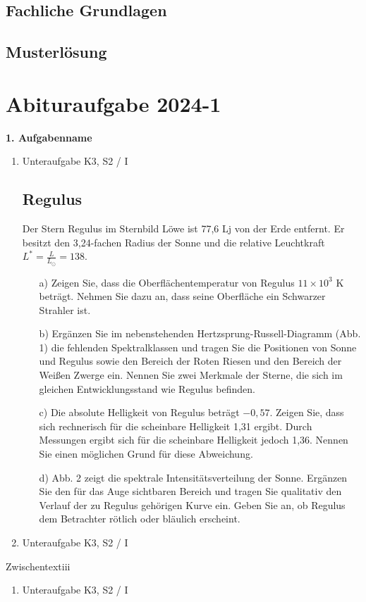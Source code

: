 \section{Fachliche Grundlagen}

\section{Musterlösung}


\chapter{Abituraufgabe 2024-1}\label{Denk} 
\begin{aufgabe} 
\textbf{1. Aufgabenname} 
\begin{enumerate} 
    \item Unteraufgabe \hfill K3, S2 / I 
    \section*{Regulus} 
    Der Stern Regulus im Sternbild Löwe ist 77,6 Lj von der Erde entfernt. Er besitzt den 3,24-fachen Radius der Sonne und die relative Leuchtkraft $L^* = \frac{L}{L_\odot} = 138$. 
    \begin{enumerate} 
        \item[a)] Zeigen Sie, dass die Oberflächentemperatur von Regulus $11 \times 10^3$ K beträgt. Nehmen Sie dazu an, dass seine Oberfläche ein Schwarzer Strahler ist. 
        \item[b)] Ergänzen Sie im nebenstehenden Hertzsprung-Russell-Diagramm (Abb. 1) die fehlenden Spektralklassen und tragen Sie die Positionen von Sonne und Regulus sowie den Bereich der Roten Riesen und den Bereich der Weißen Zwerge ein. Nennen Sie zwei Merkmale der Sterne, die sich im gleichen Entwicklungsstand wie Regulus befinden. 
        \item[c)] Die absolute Helligkeit von Regulus beträgt $-0,57$. Zeigen Sie, dass sich rechnerisch für die scheinbare Helligkeit 1,31 ergibt. Durch Messungen ergibt sich für die scheinbare Helligkeit jedoch 1,36. Nennen Sie einen möglichen Grund für diese Abweichung. 
        \item[d)] Abb. 2 zeigt die spektrale Intensitätsverteilung der Sonne. Ergänzen Sie den für das Auge sichtbaren Bereich und tragen Sie qualitativ den Verlauf der zu Regulus gehörigen Kurve ein. Geben Sie an, ob Regulus dem Betrachter rötlich oder bläulich erscheint. 
    \end{enumerate} 
    \item Unteraufgabe \hfill K3, S2 / I 
\end{enumerate} 
Zwischentextiii 
\begin{enumerate}[resume] 
    \item Unteraufgabe \hfill K3, S2 / I 

\end{enumerate}
\end{aufgabe}
